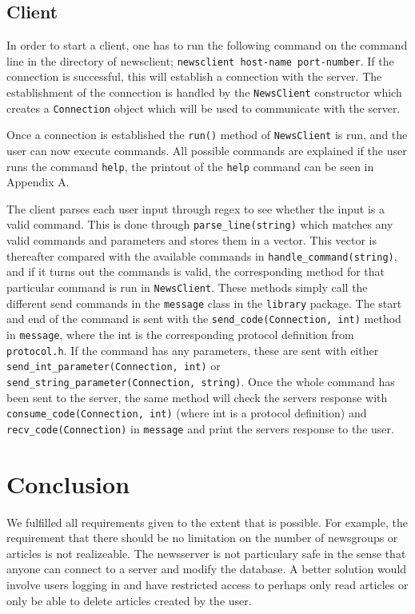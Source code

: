 \documentclass[a4paper]{article}
\begin{document}
\subsection{Client}
\label{subsec:client}
In order to start a client, one has to run the following command on the command line in the directory of newsclient; \texttt{newsclient host-name port-number}. If the connection is successful, this will establish a connection with the server. The establishment of the connection is handled by the \texttt{NewsClient} constructor which creates a \texttt{Connection} object which will be used to communicate with the server.

Once a connection is established the \texttt{run()} method of \texttt{NewsClient} is run, and the user can now execute commands. All possible commands are explained if the user runs the command \texttt{help}, the printout of the \texttt{help} command can be seen in Appendix A.

The client parses each user input through regex to see whether the input is a valid command. This is done through \texttt{parse\_line(string)} which matches any valid commands and parameters and stores them in a vector. This vector is thereafter compared with the available commands in \texttt{handle\_command(string)}, and if it turns out the commands is valid, the corresponding method for that particular command is run in \texttt{NewsClient}. These methods simply call the different send commands in the \texttt{message} class in the \texttt{library} package. The start and end of the command is sent with the \texttt{send\_code(Connection, int)} method in \texttt{message}, where the int is the corresponding protocol definition from \texttt{protocol.h}. If the command has any parameters, these are sent with either \texttt{send\_int\_parameter(Connection, int)} or \texttt{send\_string\_parameter(Connection, string)}. Once the whole command has been sent to the server, the same method will check the servers response with \texttt{consume\_code(Connection, int)} (where int is a protocol definition) and \texttt{recv\_code(Connection)} in \texttt{message} and print the servers response to the user.


\section{Conclusion}
We fulfilled all requirements given to the extent that is possible. For example, the requirement that there should be no limitation on the number of newsgroups or articles is not realizeable. The newsserver is not particulary safe in the sense that anyone can connect to a server and modify the database. A better solution would involve users logging in and have restricted access to perhaps only read articles or only be able to delete articles created by the user.
\end{document}
